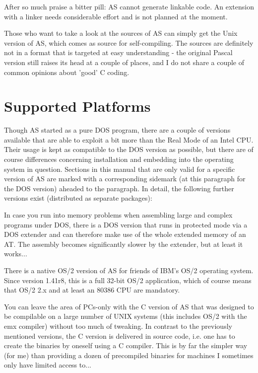\documentclass[12pt,twoside]{report}
\begin{document}
After so much praise a bitter pill: AS cannot generate linkable code.
An extension with a linker needs considerable effort and is not planned
at the moment.

Those who want to take a look at the sources of AS can simply get the
Unix version of AS, which comes as source for self-compiling.  The sources
are definitely not in a format that is targeted at easy understanding -
the original Pascal version still raises its head at a couple of places,
and I do not share a couple of common opinions about 'good' C coding.


\section{Supported Platforms}

Though AS started as a pure DOS  program, there are a
couple of versions available that are able to exploit a bit more than the
Real Mode of an Intel CPU.  Their usage is kept as compatible to the DOS
version as possible, but there are of course differences concerning
installation and embedding into the operating system in question.
Sections in this manual that are only valid for a specific version of AS
are marked with a corresponding sidemark (at this paragraph for the DOS
version) aheaded to the paragraph.  In detail, the following further
versions exist (distributed as separate packages):

In case you run into memory problems when assembling
large and complex programs under DOS, there is a DOS version that runs in
protected mode via a DOS extender and can therefore make use of the whole
extended memory of an AT.  The assembly becomes significantly slower by
the extender, but at least it works...

There is a native OS/2  version of AS for friends of
IBM's OS/2 operating system.  Since version 1.41r8, this is a full 32-bit
OS/2 application, which of course means that OS/2 2.x and at least an
80386 CPU are mandatory.

You can leave  the area of PCs-only with the C
version of AS that was designed to be compilable on a large number of UNIX
systems (this includes OS/2 with the emx compiler) without too much of
tweaking.  In contrast to the previously mentioned versions, the C version
is delivered in source code, i.e. one has to create the binaries by
oneself using a C compiler.  This is by far the simpler way (for me) than
providing a dozen of precompiled binaries for machines I sometimes only
have limited access to...
\end{document}
